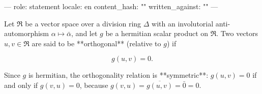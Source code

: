 ---
role: statement
locale: en
content_hash: ""
written_against: ""
---

Let $\mathfrak{R}$ be a vector space over a division ring $\Delta$ with an involutorial anti-automorphism $\alpha \mapsto \bar{\alpha}$, and let $g$ be a hermitian scalar product on $\mathfrak{R}$. Two vectors $u, v \in \mathfrak{R}$ are said to be **orthogonal** (relative to $g$) if

$$g(u, v) = 0.$$

Since $g$ is hermitian, the orthogonality relation is **symmetric**: $g(u, v) = 0$ if and only if $g(v, u) = 0$, because $g(v, u) = \overline{g(u, v)} = \bar{0} = 0$.
